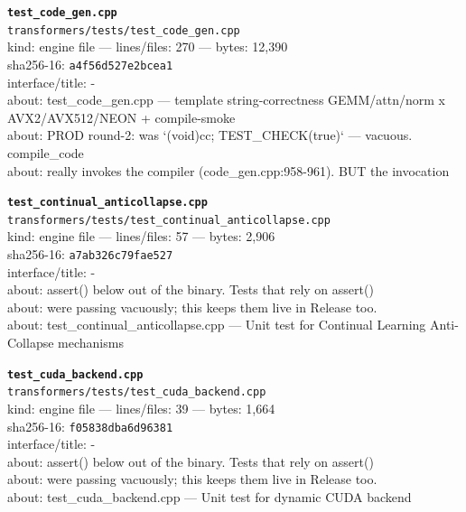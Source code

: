 \noindent\textbf{\texttt{test\_code\_gen.cpp}}\\
\texttt{transformers/tests/test\_code\_gen.cpp}\\
kind: engine file --- lines/files: 270 --- bytes: 12,390\\
sha256-16: \texttt{a4f56d527e2bcea1}\\
interface/title: -\\
about: test\_code\_gen.cpp — template string-correctness GEMM/attn/norm x AVX2/AVX512/NEON + compile-smoke\\
about: PROD round-2: was `(void)cc; TEST\_CHECK(true)` — vacuous. compile\_code\\
about: really invokes the compiler (code\_gen.cpp:958-961). BUT the invocation\\
\vspace*{6.0pt}

\noindent\textbf{\texttt{test\_continual\_anticollapse.cpp}}\\
\texttt{transformers/tests/test\_continual\_anticollapse.cpp}\\
kind: engine file --- lines/files: 57 --- bytes: 2,906\\
sha256-16: \texttt{a7ab326c79fae527}\\
interface/title: -\\
about: assert() below out of the binary. Tests that rely on assert()\\
about: were passing vacuously; this keeps them live in Release too.\\
about: test\_continual\_anticollapse.cpp — Unit test for Continual Learning Anti-Collapse mechanisms\\
\vspace*{6.0pt}
\newpage

\noindent\textbf{\texttt{test\_cuda\_backend.cpp}}\\
\texttt{transformers/tests/test\_cuda\_backend.cpp}\\
kind: engine file --- lines/files: 39 --- bytes: 1,664\\
sha256-16: \texttt{f05838dba6d96381}\\
interface/title: -\\
about: assert() below out of the binary. Tests that rely on assert()\\
about: were passing vacuously; this keeps them live in Release too.\\
about: test\_cuda\_backend.cpp — Unit test for dynamic CUDA backend\\
\vspace*{6.0pt}

